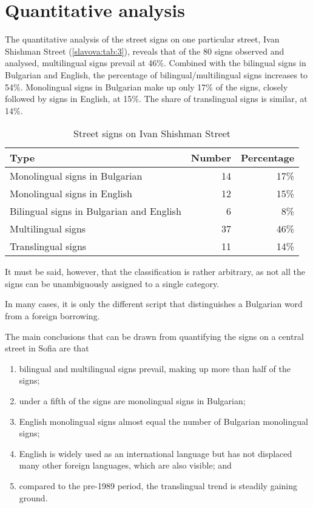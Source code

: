 \documentclass[output=paper]{langscibook}
\begin{document}
\section{Quantitative analysis} \label{slavova:sec:8}
The quantitative analysis of the street signs on one particular street, Ivan Shishman Street (\autoref{slavova:tab:3}), reveals that of the 80 signs observed and analysed, multilingual signs prevail at 46\%. Combined with the bilingual signs in Bulgarian and English, the percentage of bilingual/multilingual signs increases to 54\%. Monolingual signs in Bulgarian make up only 17\% of the signs, closely followed by signs in English, at 15\%. The share of translingual signs is similar, at 14\%.

\begin{table}
  \begin{tabular}{lrr}\midrule\toprule
    Type & Number & Percentage \\\midrule
    Monolingual signs in Bulgarian & 14 & 17\% \\
    Monolingual signs in English & 12 & 15\% \\
    Bilingual signs in Bulgarian and English & 6 & 8\% \\
    Multilingual signs & 37 & 46\% \\
    Translingual signs & 11 & 14\% \\ \bottomrule\midrule
  \end{tabular}
  \caption{Street signs on Ivan Shishman Street}
  \label{slavova:tab:3}
\end{table}


It must be said, however, that the classification is rather arbitrary, as not all the signs can be unambiguously assigned to a single category. 

In many cases, it is only the different script that distinguishes a Bulgarian word from a foreign borrowing. 

The main conclusions that can be drawn from quantifying the signs on a central street in Sofia are that

\begin{enumerate}%
  \item bilingual and multilingual signs prevail, making up more than half of the signs;
  \item under a fifth of the signs are monolingual signs in Bulgarian;
  \item English monolingual signs almost equal the number of Bulgarian monolingual signs;
  \item English is widely used as an international language but has not displaced many other foreign languages, which are also visible; and
  \item compared to the pre-1989 period, the translingual trend is steadily gaining ground.
\end{enumerate}
\end{document}
